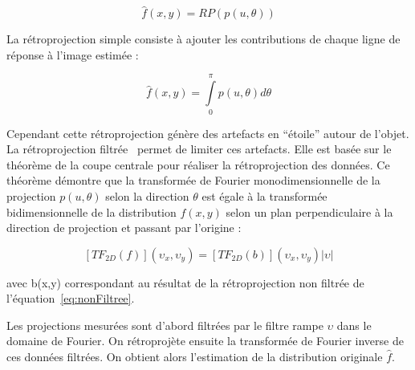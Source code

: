 \begin{equation}
\hat{f}(x,y) = RP(p(u, \theta))
\end{equation}

La rétroprojection simple consiste à ajouter les contributions de chaque ligne de réponse à l'image estimée :

\begin{equation}
\hat{f}(x,y) = \int\limits_0^\pi p(u, \theta)d\theta
\label{eq:nonFiltree}
\end{equation}


Cependant cette rétroprojection génère des artefacts en ``étoile'' autour de l'objet. La rétroprojection filtrée~\cite{kinahan1988three} permet de limiter ces artefacts. Elle est basée sur le théorème de la coupe centrale pour réaliser la rétroprojection des données. Ce théorème démontre que la transformée de Fourier  monodimensionnelle de la projection $p(u,\theta)$ selon la direction $\theta$ est égale à la transformée bidimensionnelle de la distribution $f(x,y)$ selon un plan perpendiculaire à la direction de projection et passant par l'origine :

\begin{equation}
\left[ TF_{2D}(f) \right](\upsilon_x, \upsilon_y) = \left[ TF_{2D}(b) \right](\upsilon_x, \upsilon_y)|\upsilon|
\end{equation}

avec b(x,y) correspondant au résultat de la rétroprojection non filtrée de l'équation~\ref{eq:nonFiltree}. 

Les projections mesurées sont d'abord filtrées par le filtre rampe $\upsilon$ dans le domaine de Fourier. On rétroprojète ensuite la transformée de Fourier inverse de ces données filtrées. On obtient alors l'estimation de la distribution originale $\hat{f}$.